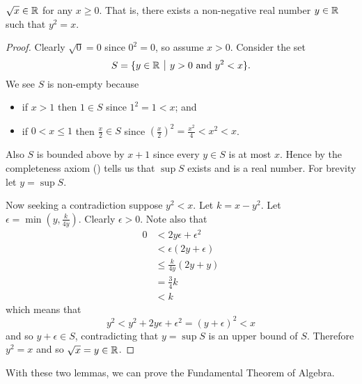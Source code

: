 \begin{lemma}\label{lemma-non-negative-real-number-has-square-root}
    $\sqrt x \in \mathbb{R}$ for any $x \geq 0$. That is, there exists a non-negative real number $y \in \mathbb{R}$ such that $y^2 = x$.
\end{lemma}
\begin{proof}
    Clearly $\sqrt0=0$ since $0^2=0$, so assume $x > 0$. Consider the set
    \[
        S = \{y \in \R \vert y > 0 \text{ and } y^2 < x\}.
    \]
    We see $S$ is non-empty because
    \begin{itemize}
        \item if $x > 1$ then $1 \in S$ since $1^2 = 1 < x$; and
        \item if $0 < x \leq 1$ then $\frac x2 \in S$ since $\left(\frac x2\right)^2 = \frac{x^2}4 < x^2 < x$.
    \end{itemize}
    Also $S$ is bounded above by $x + 1$ since every $y \in S$ is at most $x$. Hence by the completeness axiom () tells us that $\sup S$ exists and is a real number. For brevity let $y = \sup S$.

    Now seeking a contradiction suppose $y^2 < x$. Let $k = x - y^2$. Let $\epsilon = \min(y, \frac{k}{4y})$. Clearly $\epsilon > 0$. Note also that
    \begin{align*}
        0 &< 2y\epsilon + \epsilon^2\\
        &<\epsilon(2y + \epsilon)\\
        &\leq \frac{k}{4y}(2y + y)\\
        &= \frac 34 k\\
        &< k
    \end{align*}
    which means that
    \[
        y^2 < y^2 + 2y\epsilon + \epsilon^2 = (y+\epsilon)^2 < x
    \]
    and so $y + \epsilon \in S$, contradicting that $y = \sup S$ is an upper bound of $S$. Therefore $y^2 = x$ and so $\sqrt x = y \in \mathbb{R}$.
\end{proof}

With these two lemmas, we can prove the Fundamental Theorem of Algebra.

